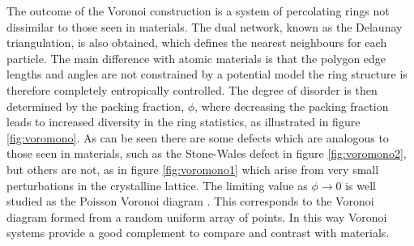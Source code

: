 The outcome of the Voronoi construction is a system of percolating rings not dissimilar to those seen in materials.
The dual network, known as the Delaunay triangulation, is also obtained, which defines the nearest neighbours for each particle.
The main difference with atomic materials is that the polygon edge lengths and angles are not constrained by a potential model the ring structure is therefore completely entropically controlled.
The degree of disorder is then determined by the packing fraction, $\phi$, where decreasing the packing fraction leads to increased diversity in the ring statistics, as illustrated in figure \ref{fig:voromono}.
As can be seen there are some defects which are analogous to those seen in materials, such as the Stone\--Wales defect in figure \ref{fig:voromono2}, but others are not, as in figure \ref{fig:voromono1} which arise from very small perturbations in the crystalline lattice.
The limiting value as $\phi\rightarrow 0$ is well studied as the Poisson Voronoi diagram \cite{Boots1983,Tanemura2003}.
This corresponds to the Voronoi diagram formed from a random uniform array of points.
In this way Voronoi systems provide a good complement to compare and contrast with materials.

